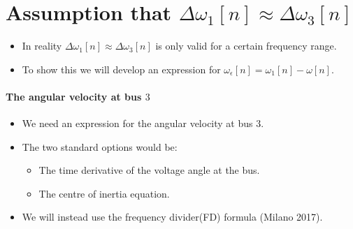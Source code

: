 \section{Assumption that $\Delta \omega_1[n] \approx \Delta \omega_3[n]$}
\begin{frame}{\secname}
	\begin{itemize}
		\item In reality $\Delta \omega_1[n] \approx \Delta \omega_3[n]$ is only valid for a certain frequency range.
		\item To show this we will develop an expression for $\omega_{\epsilon}[n] = \omega_1[n]-\omega[n]$.
	\end{itemize}
\end{frame}
\begin{frame}{\secname}
	\framesubtitle{The angular velocity at bus $3$}
	\begin{itemize}
		\item We need an expression for the angular velocity at bus $3$.
		\item The two standard options would be:
			\begin{itemize}
				\item The time derivative of the voltage angle at the bus.
				\item The centre of inertia equation.
			\end{itemize}
		\item We will instead use the frequency divider(FD) formula (Milano 2017).
	\end{itemize}
\end{frame}
